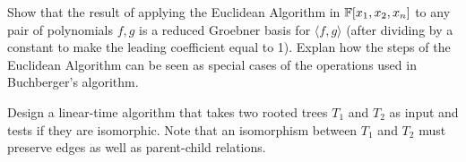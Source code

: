 
%
%
%
%




\begin{exercise}
Show that the result of applying the Euclidean Algorithm in ${\mathbb{F}}[x_1,x_2, x_n]$ to any pair of polynomials $f,g$ is a reduced Groebner basis for $\langle f,g \rangle$ (after dividing by a constant to make the leading coefficient equal to 1). Explan how the steps of the Euclidean Algorithm can be seen as special cases of the operations used in Buchberger's algorithm.
\end{exercise}



\begin{ps1}
Design a linear-time algorithm that takes two rooted trees $T_1$ and $T_2$ as input and tests if they are isomorphic. Note that an isomorphism between $T_1$ and $T_2$ must preserve edges as well as parent-child relations.
\end{ps1}

